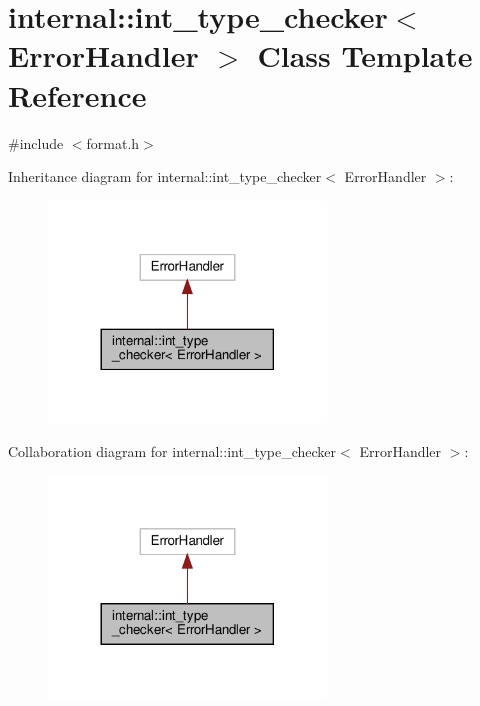 \hypertarget{classinternal_1_1int__type__checker}{}\section{internal\+:\+:int\+\_\+type\+\_\+checker$<$ Error\+Handler $>$ Class Template Reference}
\label{classinternal_1_1int__type__checker}


{\ttfamily \#include $<$format.\+h$>$}



Inheritance diagram for internal\+:\+:int\+\_\+type\+\_\+checker$<$ Error\+Handler $>$\+:
\nopagebreak
\begin{figure}[H]
\begin{center}
\leavevmode
\includegraphics[width=209pt]{classinternal_1_1int__type__checker__inherit__graph}
\end{center}
\end{figure}


Collaboration diagram for internal\+:\+:int\+\_\+type\+\_\+checker$<$ Error\+Handler $>$\+:
\nopagebreak
\begin{figure}[H]
\begin{center}
\leavevmode
\includegraphics[width=209pt]{classinternal_1_1int__type__checker__coll__graph}
\end{center}
\end{figure}
